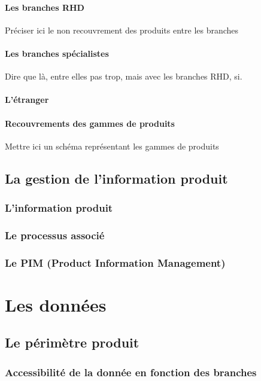 \documentclass{report}
\begin{document}
            \subsection{Les branches RHD}
            
            Préciser ici le non recouvrement des produits entre les branches

            \subsection{Les branches spécialistes}

            Dire que là, entre elles pas trop, mais avec les branches RHD, si.

            \subsection{L'étranger}
            \subsection{Recouvrements des gammes de produits}

            Mettre ici un schéma représentant les gammes de produits

    \chapter{La gestion de l'information produit}
        \section{L'information produit}
        \section{Le processus associé}
        \section{Le PIM (Product Information Management)}

\part{Les données}
    \chapter{Le périmètre produit}
        \section{Accessibilité de la donnée en fonction des branches}
\end{document}
